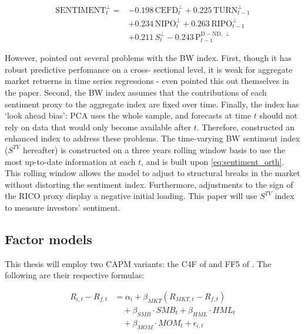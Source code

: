 \begin{equation} %
    \label{eq:sentiment_orth}
    \begin{split}
    \text{SENTIMENT}^{\perp}_t = &-0.198\,\text{CEFD}^{\perp}_t + 0.225\,\text{TURN}^{\perp}_{t-1} \\
    &+ 0.234\,\text{NIPO}^{\perp}_t + 0.263\,\text{RIPO}^{\perp}_{t-1} \\
    &+ 0.211\,S^{\perp}_t - 0.243\,\text{P}^{\text{D} - \text{ND},\perp}_{t-1}
    \end{split}
\end{equation}

However,  pointed out several problems with the BW index. First, though it has robust predictive perfomance on a cross- sectional level, it is weak for aggregate market retuerns in time series regressions - even  pointed this out themselves in the paper. Second, the BW index assumes that the contributions of each sentiment proxy to the aggregate index are fixed over time. Finally, the index has `look ahead bias': PCA uses the whole sample, and forecasts at time $t$ should not rely on data that would only become available after $t$. Therefore,  constructed an enhanced index to address these problems. The time-varying BW sentiment index ($S^{TV}$ hereafter) is constructed on a three years rolling window basis to use the most up-to-date information at each $t$, and is built upon \cref{eq:sentiment_orth}. This rolling window allows the model to adjust to structural breaks in the market without distorting the sentiment index. Furthermore, adjustments to the sign of the RICO proxy display a negative initial loading. This paper will use  $S^{TV}$ index to measure investors' sentiment.


\subsection{Factor models}
This thesis will employ two CAPM variants: the C4F of  and FF5 of . The following are their respective formulas:

\begin{equation}
    \label{eq:c4f}
    \begin{split}
        R_{i,t} - R_{f,t} &= \alpha_i + \beta_{MKT} (R_{MKT,t} - R_{f,t}) \\
        &\quad + \beta_{SMB} \cdot SMB_t + \beta_{HML} \cdot HML_t \\
        &\quad + \beta_{MOM} \cdot MOM_t + \epsilon_{i,t}
    \end{split}
\end{equation}

